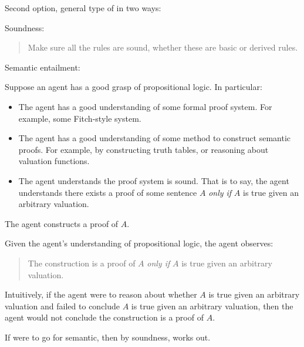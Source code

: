 \begin{note}
  Second option, general type of  in two ways:

  Soundness:

  \begin{quote}
    Make sure all the rules are sound, whether these are basic or derived rules.
  \end{quote}

  Semantic entailment:

  \begin{illustration}
    \label{illu:sketch:prop-logic}
    Suppose an agent has a good grasp of propositional logic.
    In particular:
    \begin{itemize}
    \item
      The agent has a good understanding of some formal proof system.
      For example, some Fitch-style system.
    \item
      The agent has a good understanding of some method to construct semantic proofs.
      For example, by constructing truth tables, or reasoning about valuation functions.
    \item
      The agent understands the proof system is sound.
      That is to say, the agent understands there exists a proof of some sentence \(A\) \emph{only if} \(A\) is true given an arbitrary valuation.
    \end{itemize}
    The agent constructs a proof of \(A\).

    Given the agent's understanding of propositional logic, the agent observes:
    \begin{quote}
      The construction is a proof of \(A\) \emph{only if} \(A\) is true given an arbitrary valuation.
    \end{quote}
  \end{illustration}

  Intuitively, if the agent were to reason about whether \(A\) is true given an arbitrary valuation and failed to conclude \(A\) is true given an arbitrary valuation, then the agent would not conclude the construction is a proof of \(A\).

  If were to go for semantic, then by soundness, works out.
\end{note}


